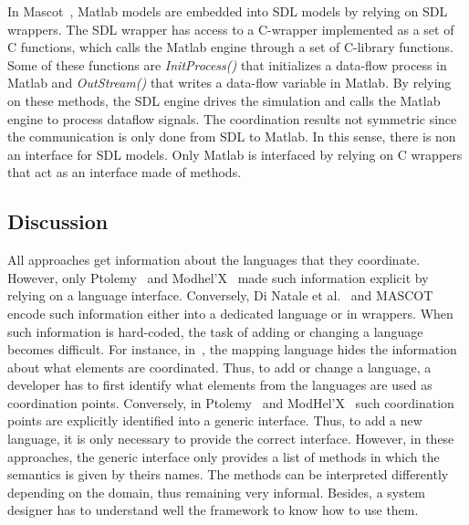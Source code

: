 In Mascot~\cite{mascotbib}, Matlab models are embedded into SDL models by relying on SDL wrappers. The SDL wrapper has access to a C-wrapper implemented as a set of C functions, which calls the Matlab engine through a set of C-library functions. Some of these functions are \emph{InitProcess()} that initializes a data-flow process in Matlab and \emph{OutStream()} that writes a data-flow variable in Matlab. By relying on these methods, the SDL engine drives the simulation and calls the Matlab engine to process dataflow signals. The coordination results not symmetric since the communication is only done from SDL to Matlab. In this sense, there is non an interface for SDL models. Only Matlab is interfaced by relying on C wrappers that act as an interface made of methods.
\subsection{Discussion}
All approaches get information about the languages that they coordinate. However, only Ptolemy~\cite{ptoleframebib} and Modhel'X~\cite{modhelxbib} made such information explicit by relying on a language interface. Conversely, Di Natale et al.~\cite{dinatale} and MASCOT~\cite{mascotbib} encode such information either into a dedicated language or in wrappers. When such information is hard-coded, the task of adding or changing a language becomes difficult. For instance, in~\cite{dinatale}, the mapping language hides the information about what elements are coordinated. Thus, to add or change a language, a developer has to first identify what elements from the languages are used as coordination points. Conversely, in Ptolemy~\cite{ptoleframebib} and ModHel'X~\cite{modhelxbib} such coordination points are explicitly identified into a generic interface. Thus, to add a new language, it is only necessary to provide the correct interface. However, in these approaches, the generic interface only provides a list of methods in which the semantics is given by theirs names. The methods can be interpreted differently depending on the domain, thus remaining very informal. Besides, a system designer has to understand well the framework to know how to use them. 


